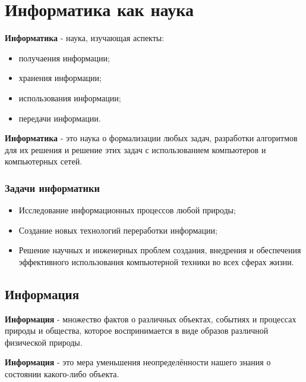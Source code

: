 \section{Информатика как наука}

\begin{definition}
  \textbf{Информатика} - наука, изучающая аспекты:
  \begin{itemize}
    \item получаения информации;
    \item хранения информации;
    \item использования информации;
    \item передачи информации.
  \end{itemize}
\end{definition}

\begin{definition}
  \textbf{Информатика} - это наука о формализации любых задач, разработки алгоритмов для их решения и решение этих задач с использованием компьютеров и компьютерных сетей.
\end{definition}

\subsubsection*{Задачи информатики}

\begin{itemize}
  \item Исследование информационных процессов любой природы;
  \item Создание новых технологий переработки информации;
  \item Решение научных и инженерных проблем создания, внедрения и обеспечения эффективного использования компьютерной техники во всех сферах жизни.
\end{itemize}

\subsection{Информация}

\begin{definition}
  \textbf{Информация} - множество фактов о различных объектах, событиях и процессах природы и общества, которое воспринимается в виде образов различной физической природы.
\end{definition}

\begin{definition}
  \textbf{Информация} - это мера уменьшения неопределённости нашего знания о состоянии какого-либо объекта.
\end{definition}


